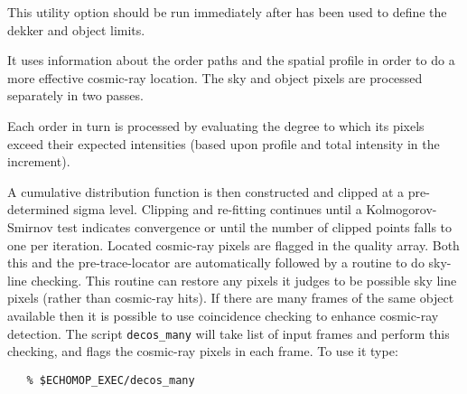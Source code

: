 


This utility option should be run immediately after
has been used to define the dekker and  object limits.

It uses information about the order paths and the spatial profile in order
to do a more effective cosmic-ray location. The sky and object pixels are
processed separately in two passes.

Each order in turn is processed by evaluating the degree to which its
pixels exceed their expected intensities (based upon profile and total
intensity in the increment).

A cumulative distribution function is then constructed and clipped at a
pre-determined sigma level. Clipping and re-fitting continues until a
Kolmogorov-Smirnov test indicates convergence or until the number of
clipped points falls to one per iteration.
Located cosmic-ray pixels are flagged in the quality array. Both this and
the pre-trace-locator are automatically followed by a routine to do
sky-line checking. This routine can restore any pixels it judges to be
possible sky line pixels (rather than cosmic-ray hits).
If there are many frames of the same object available then it is possible
to use coincidence checking to enhance cosmic-ray detection. The script
{\tt decos\_many} will take list of input frames and perform this checking,
and flags the cosmic-ray pixels in each frame.  To use it type:

\begin{verbatim}
   % $ECHOMOP_EXEC/decos_many
\end{verbatim}



